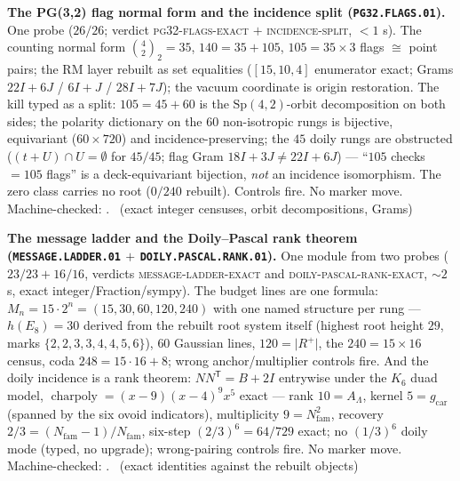 \documentclass[11pt,a4paper]{article}
\newcommand{\gcar}{g_{\mathrm{car}}}
\newcommand{\Nfam}{N_{\mathrm{fam}}}
\theoremstyle{definition}
\begin{document}
\par\smallskip\noindent\textbf{The PG(3,2) flag normal form and
the incidence split (\texttt{PG32.FLAGS.01}).}
One probe ($26/26$; verdict \textsc{pg32-flags-exact} $+$
\textsc{incidence-split}, $<1$ s).  The counting normal form
$\binom{4}{2}_2 = 35$, $140 = 35 + 105$, $105 = 35\times3$ flags
$\cong$ point pairs; the RM layer rebuilt as set equalities
($[15,10,4]$ enumerator exact; Grams $22I{+}6J$ / $6I{+}J$ /
$28I{+}7J$); the vacuum coordinate is origin restoration.  The
kill typed as a split: $105 = 45 + 60$ is the
$\mathrm{Sp}(4,2)$-orbit decomposition on both sides; the
polarity dictionary on the $60$ non-isotropic rungs is bijective,
equivariant ($60\times720$) and incidence-preserving; the $45$
doily rungs are obstructed ($(t{+}U)\cap U = \emptyset$ for
$45/45$; flag Gram $18I{+}3J \ne 22I{+}6J$) --- ``$105$ checks
$= 105$ flags'' is a deck-equivariant bijection, \emph{not} an
incidence isomorphism.  The zero class carries no root ($0/240$
rebuilt).  Controls fire.  No marker move.
Machine-checked: .
\mE\ (exact integer censuses, orbit decompositions, Grams)
\par\smallskip

\par\smallskip\noindent\textbf{The message ladder and the
Doily--Pascal rank theorem (\texttt{MESSAGE.LADDER.01} $+$
\texttt{DOILY.PASCAL.RANK.01}).}
One module from two probes ($23/23 + 16/16$, verdicts
\textsc{message-ladder-exact} and
\textsc{doily-pascal-rank-exact}, ${\sim}2$ s, exact
integer/Fraction/sympy).  The budget lines are one formula:
$M_n = 15\cdot2^n = (15, 30, 60, 120, 240)$ with one named
structure per rung --- $h(E_8) = 30$ derived from the rebuilt
root system itself (highest root height $29$, marks
$\{2,2,3,3,4,4,5,6\}$), $60$ Gaussian lines, $120 = \lvert
R^+\rvert$, the $240 = 15\times16$ census, coda $248 = 15\cdot16
+ 8$; wrong anchor/multiplier controls fire.  And the doily
incidence is a rank theorem: $NN^{\mathsf T} = B + 2I$ entrywise
under the $K_6$ duad model, $\operatorname{charpoly} =
(x-9)(x-4)^9x^5$ exact --- rank $10 = A_\Lambda$, kernel
$5 = \gcar$ (spanned by the six ovoid indicators), multiplicity
$9 = \Nfam^2$, recovery $2/3 = (\Nfam-1)/\Nfam$, six-step
$(2/3)^6 = 64/729$ exact; no $(1/3)^6$ doily mode (typed, no
upgrade); wrong-pairing controls fire.  No marker move.
Machine-checked: .
\mE\ (exact identities against the rebuilt objects)
\par\smallskip
\end{document}
